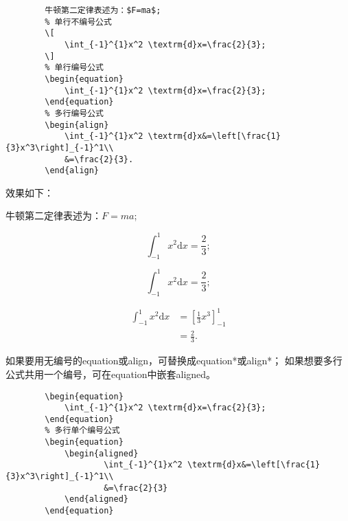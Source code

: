 \begin{center}
\begin{minipage}{0.8\textwidth}
    \hspace{1em}
    \begin{lstlisting}[language={[LaTeX]TeX}]
        % 行内公式
        牛顿第二定律表述为：$F=ma$;
        % 单行不编号公式
        \[
            \int_{-1}^{1}x^2 \textrm{d}x=\frac{2}{3};
        \]
        % 单行编号公式
        \begin{equation}
            \int_{-1}^{1}x^2 \textrm{d}x=\frac{2}{3};
        \end{equation}
        % 多行编号公式
        \begin{align}
            \int_{-1}^{1}x^2 \textrm{d}x&=\left[\frac{1}{3}x^3\right]_{-1}^1\\
            &=\frac{2}{3}.
        \end{align}
\end{lstlisting}
\end{minipage}
\end{center}

效果如下：

牛顿第二定律表述为：$F=ma$;

\[
    \int_{-1}^{1}x^2 \textrm{d}x=\frac{2}{3};
\]

\begin{equation}
    \int_{-1}^{1}x^2 \textrm{d}x=\frac{2}{3};
\end{equation}

\begin{align}
    \int_{-1}^{1}x^2 \textrm{d}x&=\left[\frac{1}{3}x^3\right]_{-1}^1\\
    &=\frac{2}{3}.
\end{align}

如果要用无编号的equation或align，可替换成equation*或align*；
如果想要多行公式共用一个编号，可在equation中嵌套aligned。

\begin{center}
\begin{minipage}{0.8\textwidth}
    \hspace{1em}
\begin{lstlisting}[language={[LaTeX]TeX}]
        % 单行不编号公式
        \begin{equation}
            \int_{-1}^{1}x^2 \textrm{d}x=\frac{2}{3};
        \end{equation}
        % 多行单个编号公式
        \begin{equation}
            \begin{aligned}
                    \int_{-1}^{1}x^2 \textrm{d}x&=\left[\frac{1}{3}x^3\right]_{-1}^1\\
                    &=\frac{2}{3}
            \end{aligned}
        \end{equation}
\end{lstlisting}
\end{minipage}
\end{center}
    
